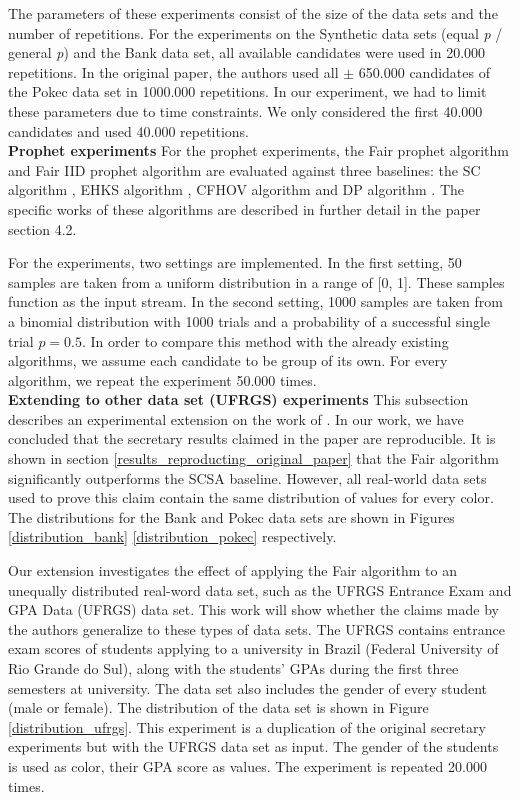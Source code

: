 The parameters of these experiments consist of the size of the data sets and the number of repetitions. For the experiments on the Synthetic data sets (equal \textit{p} / general \textit{p}) and the Bank data set, all available candidates were used in 20.000 repetitions. In the original paper, the authors used all $\pm$ 650.000 candidates of the Pokec data set in 1000.000 repetitions. In our experiment, we had to limit these parameters due to time constraints. We only considered the first 40.000 candidates and used 40.000 repetitions.\\

\textbf{Prophet experiments}
\FloatBarrier
\label{Prophet_Experiments}
For the prophet experiments, the Fair prophet algorithm and Fair IID prophet algorithm are evaluated against three baselines: the SC algorithm \citep{samuel1984comparison}, EHKS algorithm \citep{marx2021proceedings}, CFHOV algorithm \citep{correa2021posted} and DP algorithm \citep{brown1972great}. The specific works of these algorithms are described in further detail in the paper \citep{correa2021fairness} section 4.2.

For the experiments, two settings are implemented. In the first setting, 50 samples are taken from a uniform distribution in a range of [0, 1]. These samples function as the input stream. In the second setting, 1000 samples are taken from a binomial distribution with 1000 trials and a probability of a successful single trial $p = 0.5$. In order to compare this method with the already existing algorithms, we assume each candidate to be group of its own. For every algorithm, we repeat the experiment 50.000 times.\\

\textbf{Extending to other data set (UFRGS) experiments}
\FloatBarrier
\label{Work_beyond_original_paper}
This subsection describes an experimental extension on the work of \citep{correa2021fairness}. In our work, we have concluded that the secretary results claimed in the paper are reproducible. It is shown in section \ref{results_reproducting_original_paper} that the Fair algorithm significantly outperforms the SCSA baseline. However, all real-world data sets used to prove this claim contain the same distribution of values for every color. The distributions for the Bank and Pokec data sets are shown in Figures \ref{distribution_bank} \ref{distribution_pokec} respectively.

Our extension investigates the effect of applying the Fair algorithm to an unequally distributed real-word data set, such as the UFRGS Entrance Exam and GPA Data (UFRGS) data set. This work will show whether the claims made by the authors generalize to these types of data sets. The UFRGS contains entrance exam scores of students applying to a university in Brazil (Federal University of Rio Grande do Sul), along with the students' GPAs during the first three semesters at university. The data set also includes the gender of every student (male or female).
The distribution of the data set is shown in Figure \ref{distribution_ufrgs}. This experiment is a duplication of the original secretary experiments but with the UFRGS data set as input. The gender of the students is used as color, their GPA score as values. The experiment is repeated 20.000 times.


